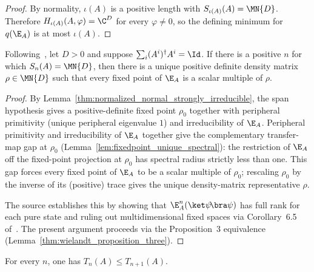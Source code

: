 \begin{proof}\leanok
    By normality, $\iota(A)$ is a
    positive length with $S_{\iota(A)}(A)=\MN{D}$. Therefore
    $H_{\iota(A)}(A,\varphi)=\C^D$ for every $\varphi\neq0$, so the defining
    minimum for $q(\E_A)$ is at most $\iota(A)$.
\end{proof}

\begin{lemma}
    \label{thm:wolf_6_15}
    \leanok
    Following~\cite[Theorem~6.15]{Wolf2012Quantum}, let $D>0$ and suppose
    $\sum_i(A^i)^\dagger A^i=\Id$. If there is a positive $n$ for which
    $S_n(A)=\MN{D}$, then there is a unique positive definite density matrix
    $\rho\in\MN{D}$ such that every fixed point of $\E_A$ is a scalar multiple
    of $\rho$.
\end{lemma}

\begin{proof}\leanok
    By Lemma~\ref{thm:normalized_normal_strongly_irreducible}, the span
    hypothesis gives a positive-definite fixed
    point $\rho_0$ together with peripheral primitivity (unique peripheral
    eigenvalue $1$) and irreducibility of $\E_A$. Peripheral primitivity and
    irreducibility of $\E_A$ together give the complementary transfer-map
    gap at $\rho_0$ (Lemma~\ref{lem:fixedpoint_unique_spectral}): the
    restriction of $\E_A$ off the fixed-point
    projection at $\rho_0$ has spectral radius strictly less than one. This
    gap forces every fixed point of $\E_A$ to be a scalar multiple of
    $\rho_0$; rescaling $\rho_0$ by the inverse of its (positive) trace
    gives the unique density-matrix representative $\rho$.

    The source establishes this by showing that $\E_A^n(\ket\psi\!\bra\psi)$
    has full rank for each pure state and ruling out multidimensional fixed
    spaces via Corollary~6.5 of~\cite{Wolf2012Quantum}. The present argument
    proceeds via the Proposition~3 equivalence
    (Lemma~\ref{thm:wielandt_proposition_three}).
\end{proof}

\begin{lemma}\label{lem:cumulative_mono}
    \leanok
    For every $n$, one has $T_n(A)\le T_{n+1}(A)$.
\end{lemma}

